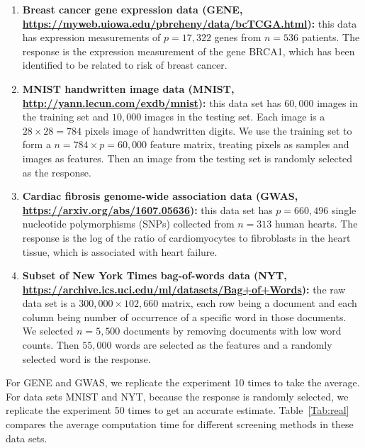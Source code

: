 \begin{enumerate}
    \item \textbf{Breast cancer gene expression data
(GENE, \url{https://myweb.uiowa.edu/pbreheny/data/bcTCGA.html}):} this data has expression measurements of $p=17,322$ genes from $n=536$ patients. The response is the expression measurement of the gene BRCA1, which has been identified to be related to risk of breast cancer.
    \item \textbf{MNIST handwritten image data
(MNIST, \url{http://yann.lecun.com/exdb/mnist}):} this data set has $60,000$ images in the training set and $10,000$ images in the testing set. Each image is a $28\times 28=784$ pixels image of handwritten digits. We use the training set to form a $n=784\times p=60,000$ feature matrix, treating pixels as samples and images as features. Then an image from the testing set is randomly selected as the response.
    \item \textbf{Cardiac fibrosis genome-wide association data
(GWAS, \url{https://arxiv.org/abs/1607.05636}):} this data set has $p=660,496$ single nucleotide
polymorphisms (SNPs) collected from $n=313$ human hearts. The response is the log of the ratio of cardiomyocytes to fibroblasts in the heart tissue, which is associated with heart failure.
    \item \textbf{Subset of New York Times bag-of-words data
(NYT, \url{https://archive.ics.uci.edu/ml/datasets/Bag+of+Words}):} the raw data set is a $300,000\times 102,660$ matrix, each row being a document and each column being number of occurrence of a specific word in those documents. We selected $n=5,500$ documents by removing documents with low word counts. Then $55,000$ words are selected as the features and a randomly selected word is the response.

\end{enumerate}


For GENE and GWAS, we replicate the experiment 10 times to take the average. For data sets MNIST and NYT, because the response is randomly selected, we replicate the experiment 50 times to get an accurate estimate. Table~\ref{Tab:real} compares the average computation time for different screening methods in these data sets.

